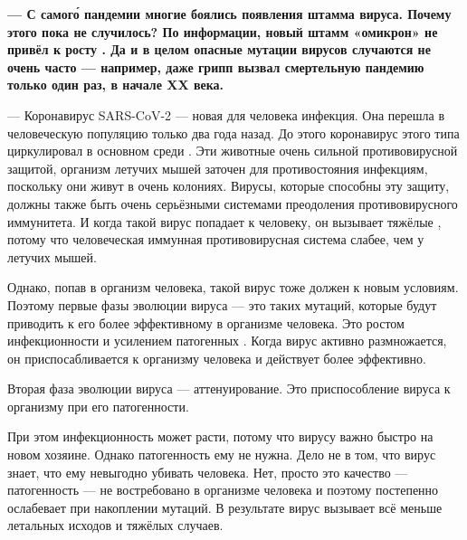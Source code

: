 {\bf --- С самог\'{о}  пандемии многие боялись появления   штамма вируса. Почему этого пока не случилось? По  информации, новый штамм «омикрон» не привёл к  росту . Да и в целом опасные мутации  вирусов случаются не очень часто --- например, даже грипп вызвал смертельную пандемию только один раз, в начале XX века.}

--- Коронавирус SARS-CoV-2 --- новая для человека инфекция. Она перешла в человеческую популяцию только два года назад. До этого коронавирус этого типа циркулировал в основном среди . Эти животные  очень сильной противовирусной защитой, организм летучих мышей заточен для противостояния инфекциям, поскольку они живут в очень  колониях. Вирусы, которые способны  эту защиту, должны также быть  очень серьёзными системами преодоления противовирусного иммунитета. И когда такой вирус попадает к человеку, он вызывает тяжёлые , потому что человеческая иммунная противовирусная система слабее, чем у летучих мышей.

Однако, попав в организм человека, такой вирус тоже должен  к новым условиям. Поэтому первые фазы эволюции вируса --- это  таких мутаций, которые будут приводить к его более эффективному  в организме человека. Это  ростом инфекционности и усилением патогенных . Когда вирус активно размножается, он приспосабливается к организму человека и действует более эффективно.

Вторая фаза эволюции вируса --- аттенуирование. Это приспособление вируса к организму при  его патогенности.

При этом инфекционность может расти, потому что вирусу важно быстро  на новом хозяине. Однако  патогенность ему не нужна. Дело не в том, что вирус  знает, что ему невыгодно убивать человека. Нет, просто это качество --- патогенность --- не востребовано в организме человека и поэтому постепенно ослабевает при накоплении мутаций. В результате вирус вызывает всё меньше летальных исходов и тяжёлых случаев.

